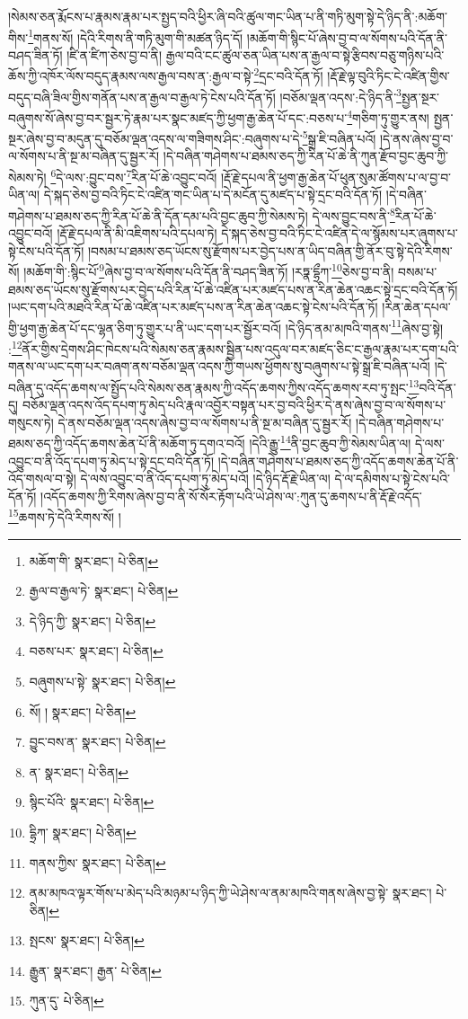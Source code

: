 །སེམས་ཅན་རྨོངས་པ་རྣམས་རྣམ་པར་སྤྱད་བའི་ཕྱིར་ཞི་བའི་ཚུལ་གང་ཡིན་པ་ནི་གཏི་མུག་སྟེ་དེ་ཉིད་ནི་:མཆོག་གིས་\footnote{མཆོག་གི་  སྣར་ཐང་།  པེ་ཅིན། }གནས་སོ། །དེའི་རིགས་ནི་གཏི་མུག་གི་མཚན་ཉིད་དོ། །མཆོག་གི་སྙིང་པོ་ཞེས་བྱ་བ་ལ་སོགས་པའི་དོན་ནི་བཤད་ཟིན་ཏོ། །ཛི་ན་ཛིཀ་ཅེས་བྱ་བ་ནི། རྒྱལ་བའི་ངང་ཚུལ་ཅན་ཡིན་པས་ན་རྒྱལ་བ་སྟེ་རྩིབས་བཅུ་གཉིས་པའི་ཆོས་ཀྱི་འཁོར་ལོས་བདུད་རྣམས་ལས་རྒྱལ་བས་ན་:རྒྱལ་བ་སྟེ་\footnote{རྒྱལ་བ་རྒྱལ་ཏེ་  སྣར་ཐང་།  པེ་ཅིན། }དྲང་བའི་དོན་ཏོ། །རྡོ་རྗེ་ལྟ་བུའི་ཏིང་ངེ་འཛིན་གྱིས་བདུད་བཞི་ཟིལ་གྱིས་གནོན་པས་ན་རྒྱལ་བ་རྒྱལ་ཏེ་ངེས་པའི་དོན་ཏོ། །བཅོམ་ལྡན་འདས་:དེ་ཉིད་ནི་\footnote{དེ་ཉིད་ཀྱི་  སྣར་ཐང་།  པེ་ཅིན། }སྤྱན་སྔར་བཞུགས་སོ་ཞེས་བྱ་བར་སྦྱར་ཏེ་རྣམ་པར་སྣང་མཛད་ཀྱི་ཕྱག་རྒྱ་ཆེན་པོ་དང་:བཅས་པ་\footnote{བཅས་པར་  སྣར་ཐང་།  པེ་ཅིན། }གཅིག་ཏུ་གྱུར་ནས། སྤྱན་སྔར་ཞེས་བྱ་བ་མདུན་དུ་བཅོམ་ལྡན་འདས་ལ་གཟིགས་ཤིང་:བཞུགས་པ་དེ་\footnote{བཞུགས་པ་སྟེ་  སྣར་ཐང་།  པེ་ཅིན། }སྒྲ་ཇི་བཞིན་པའོ། །དེ་ནས་ཞེས་བྱ་བ་ལ་སོགས་པ་ནི་སྔ་མ་བཞིན་དུ་སྦྱར་རོ། །དེ་བཞིན་གཤེགས་པ་ཐམས་ཅད་ཀྱི་རིན་པོ་ཆེ་ནི་ཀུན་རྫོབ་བྱང་ཆུབ་ཀྱི་སེམས་ཏེ། \footnote{སོ། །   སྣར་ཐང་།  པེ་ཅིན། }དེ་ལས་:བྱུང་བས་\footnote{བྱུང་བས་ན་  སྣར་ཐང་།  པེ་ཅིན། }རིན་པོ་ཆེ་འབྱུང་བའོ། །རྡོ་རྗེ་དཔལ་ནི་ཕྱག་རྒྱ་ཆེན་པོ་ཕུན་སུམ་ཚོགས་པ་ལ་བྱ་བ་ཡིན་ལ། དེ་སྐད་ཅེས་བྱ་བའི་ཏིང་ངེ་འཛིན་གང་ཡིན་པ་དེ་མངོན་དུ་མཛད་པ་སྟེ་དྲང་བའི་དོན་ཏོ། །དེ་བཞིན་གཤེགས་པ་ཐམས་ཅད་ཀྱི་རིན་པོ་ཆེ་ནི་དོན་དམ་པའི་བྱང་ཆུབ་ཀྱི་སེམས་ཏེ། དེ་ལས་བྱུང་བས་ནི་\footnote{ན་  སྣར་ཐང་།  པེ་ཅིན། }རིན་པོ་ཆེ་འབྱུང་བའོ། །རྡོ་རྗེ་དཔལ་ནི་མི་འཇིགས་པའི་དཔལ་ཏེ། དེ་སྐད་ཅེས་བྱ་བའི་ཏིང་ངེ་འཛིན་དེ་ལ་སྙོམས་པར་ཞུགས་པ་སྟེ་ངེས་པའི་དོན་ཏོ། །བསམ་པ་ཐམས་ཅད་ཡོངས་སུ་རྫོགས་པར་བྱེད་པས་ན་ཡིད་བཞིན་གྱི་ནོར་བུ་སྟེ་དེའི་རིགས་སོ། །མཆོག་གི་:སྙིང་པོ་\footnote{སྙིང་པོའི་  སྣར་ཐང་།  པེ་ཅིན། }ཞེས་བྱ་བ་ལ་སོགས་པའི་དོན་ནི་བཤད་ཟིན་ཏོ། །རཏྣ་དྷྲྀཀ་\footnote{དྷྲིཀ་  སྣར་ཐང་།  པེ་ཅིན། }ཅེས་བྱ་བ་ནི། བསམ་པ་ཐམས་ཅད་ཡོངས་སུ་རྫོགས་པར་བྱེད་པའི་རིན་པོ་ཆེ་འཛིན་པར་མཛད་པས་ན་རིན་ཆེན་འཆང་སྟེ་དྲང་བའི་དོན་ཏོ། །ཡང་དག་པའི་མཐའི་རིན་པོ་ཆེ་འཛིན་པར་མཛད་པས་ན་རིན་ཆེན་འཆང་སྟེ་ངེས་པའི་དོན་ཏོ། །རིན་ཆེན་དཔལ་གྱི་ཕྱག་རྒྱ་ཆེན་པོ་དང་ལྷན་ཅིག་ཏུ་གྱུར་པ་ནི་ཡང་དག་པར་སྦྱོར་བའོ། །དེ་ཉིད་ནམ་མཁའི་གནས་\footnote{གནས་ཀྱིས་  སྣར་ཐང་།  པེ་ཅིན། }ཞེས་བྱ་སྟེ། :\footnote{ནམ་མཁའ་ལྟར་གོས་པ་མེད་པའི་མཉམ་པ་ཉིད་ཀྱི་ཡེ་ཤེས་ལ་ནམ་མཁའི་གནས་ཞེས་བྱ་སྟེ་  སྣར་ཐང་།  པེ་ཅིན། }ནོར་གྱིས་དྲེགས་ཤིང་ཁེངས་པའི་སེམས་ཅན་རྣམས་སྦྱིན་པས་འདུལ་བར་མཛད་ཅིང་ང་རྒྱལ་རྣམ་པར་དག་པའི་གནས་ལ་ཡང་དག་པར་བཞག་ནས་བཅོམ་ལྡན་འདས་ཀྱི་གཡས་ཕྱོགས་སུ་བཞུགས་པ་སྟེ་སྒྲ་ཇི་བཞིན་པའོ། །དེ་བཞིན་དུ་འདོད་ཆགས་ལ་སྤྱོད་པའི་སེམས་ཅན་རྣམས་ཀྱི་འདོད་ཆགས་ཀྱིས་འདོད་ཆགས་རབ་ཏུ་སྤང་\footnote{སྤངས་  སྣར་ཐང་།  པེ་ཅིན། }བའི་དོན་དུ། བཅོམ་ལྡན་འདས་འོད་དཔག་ཏུ་མེད་པའི་རྣལ་འབྱོར་བསྟན་པར་བྱ་བའི་ཕྱིར་དེ་ནས་ཞེས་བྱ་བ་ལ་སོགས་པ་གསུངས་ཏེ། དེ་ནས་བཅོམ་ལྡན་འདས་ཞེས་བྱ་བ་ལ་སོགས་པ་ནི་སྔ་མ་བཞིན་དུ་སྦྱར་རོ། །དེ་བཞིན་གཤེགས་པ་ཐམས་ཅད་ཀྱི་འདོད་ཆགས་ཆེན་པོ་ནི་མཆོག་ཏུ་དགའ་བའོ། །དེའི་རྒྱུ་\footnote{རྒྱུན་  སྣར་ཐང་། རྒྱན་  པེ་ཅིན། }ནི་བྱང་ཆུབ་ཀྱི་སེམས་ཡིན་ལ། དེ་ལས་འབྱུང་བ་ནི་འོད་དཔག་ཏུ་མེད་པ་སྟེ་དྲང་བའི་དོན་ཏོ། །དེ་བཞིན་གཤེགས་པ་ཐམས་ཅད་ཀྱི་འདོད་ཆགས་ཆེན་པོ་ནི་འོད་གསལ་བ་སྟེ། དེ་ལས་འབྱུང་བ་ནི་འོད་དཔག་ཏུ་མེད་པའོ། །དེ་ཉིད་རྡོ་རྗེ་ཡིན་ལ། དེ་ལ་དམིགས་པ་སྟེ་ངེས་པའི་དོན་ཏོ། །འདོད་ཆགས་ཀྱི་རིགས་ཞེས་བྱ་བ་ནི་སོ་སོར་རྟོག་པའི་ཡེ་ཤེས་ལ་:ཀུན་དུ་ཆགས་པ་ནི་རྡོ་རྗེ་འདོད་\footnote{ཀུན་དུ་  པེ་ཅིན། }ཆགས་ཏེ་དེའི་རིགས་སོ། །
